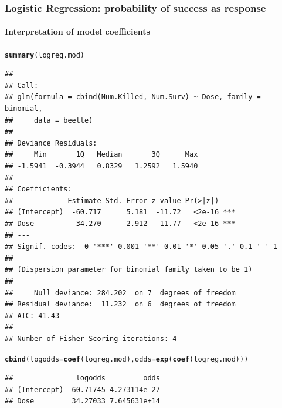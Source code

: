 \documentclass{beamer}\usepackage[]{graphicx}\usepackage[]{color}
\makeatletter
\newcommand{\hlstd}[1]{\textcolor[rgb]{0.345,0.345,0.345}{#1}}%
\newcommand{\hlkwc}[1]{\textcolor[rgb]{0.333,0.667,0.333}{#1}}%
\newcommand{\hlkwd}[1]{\textcolor[rgb]{0.737,0.353,0.396}{\textbf{#1}}}%
\newenvironment{kframe}{%
 \def\at@end@of@kframe{}%
 \ifinner\ifhmode%
  \def\at@end@of@kframe{\end{minipage}}%
  \begin{minipage}{\columnwidth}%
 \fi\fi%
 \def\FrameCommand##1{\hskip\@totalleftmargin \hskip-\fboxsep
 \colorbox{shadecolor}{##1}\hskip-\fboxsep
     \hskip-\linewidth \hskip-\@totalleftmargin \hskip\columnwidth}%
 \MakeFramed {\advance\hsize-\width
   \@totalleftmargin\z@ \linewidth\hsize
   \@setminipage}}%
 {\par\unskip\endMakeFramed%
 \at@end@of@kframe}
\newenvironment{knitrout}{}{} %
\makeatother
\begin{document}
{{{
\begin{frame}[fragile]
\frametitle{Logistic Regression: probability of success as response}
\framesubtitle{Interpretation of model coefficients}
\begin{knitrout}\tiny
{}\color{fgcolor}\begin{kframe}
\begin{alltt}
\hlkwd{summary}\hlstd{(logreg.mod)}
\end{alltt}
\begin{verbatim}
## 
## Call:
## glm(formula = cbind(Num.Killed, Num.Surv) ~ Dose, family = binomial, 
##     data = beetle)
## 
## Deviance Residuals: 
##     Min       1Q   Median       3Q      Max  
## -1.5941  -0.3944   0.8329   1.2592   1.5940  
## 
## Coefficients:
##             Estimate Std. Error z value Pr(>|z|)    
## (Intercept)  -60.717      5.181  -11.72   <2e-16 ***
## Dose          34.270      2.912   11.77   <2e-16 ***
## ---
## Signif. codes:  0 '***' 0.001 '**' 0.01 '*' 0.05 '.' 0.1 ' ' 1
## 
## (Dispersion parameter for binomial family taken to be 1)
## 
##     Null deviance: 284.202  on 7  degrees of freedom
## Residual deviance:  11.232  on 6  degrees of freedom
## AIC: 41.43
## 
## Number of Fisher Scoring iterations: 4
\end{verbatim}
\begin{alltt}
\hlkwd{cbind}\hlstd{(}\hlkwc{logodds} \hlstd{=} \hlkwd{coef}\hlstd{(logreg.mod),} \hlkwc{odds} \hlstd{=} \hlkwd{exp}\hlstd{(}\hlkwd{coef}\hlstd{(logreg.mod)))}
\end{alltt}
\begin{verbatim}
##               logodds         odds
## (Intercept) -60.71745 4.273114e-27
## Dose         34.27033 7.645631e+14
\end{verbatim}
\end{kframe}
\end{knitrout}
\end{frame}

}}}
\end{document}
